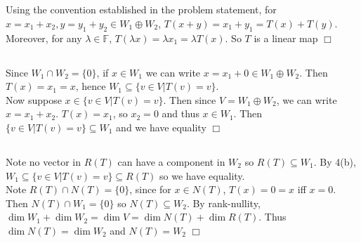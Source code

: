 \documentclass{article}
\begin{document}
\section{}
\subsection{}
Using the convention established in the problem statement, for $x = x_1 + x_2, y = y_1 + y_2 \in W_1 \oplus W_2$, $T(x+y) = x_1 + y_1 = T(x) + T(y)$. Moreover, for any $\lambda \in \mathbb{F}$, $T(\lambda x) = \lambda x_1 = \lambda T(x)$. So $T$ is a linear map $\Box$
\subsection{}
Since $W_1 \cap W_2 = \{0\}$, if $x \in W_1$ we can write $x = x_1 + 0 \in W_1 \oplus W_2$. Then $T(x) = x_1 = x$, hence $W_1 \subseteq \{v \in V | T(v) = v\}$.\\
Now suppose $x \in \{v \in V | T(v) = v\}$. Then since $V = W_1 \oplus W_2$, we can write $x = x_1 + x_2$. $T(x) = x_1$, so $x_2 = 0$ and thus $x \in W_1$. Then $\{v \in V | T(v) = v\} \subseteq W_1$ and we have equality $\Box$
\subsection{}
Note no vector in $R(T)$ can have a component in $W_2$ so $R(T) \subseteq W_1$. By 4(b), $W_1 \subseteq \{v \in V | T(v) = v\} \subseteq R(T)$ so we have equality.\\
Note $R(T) \cap N(T) = \{0\}$, since for $x \in N(T)$, $T(x) = 0 = x$ iff $x = 0$. Then $N(T) \cap W_1 = \{0\}$ so $N(T) \subseteq W_2$. By rank-nullity, $ \dim W_1 + \dim W_2 = \dim V = \dim N(T) + \dim R(T)$. Thus $\dim N(T) = \dim W_2$ and $N(T) = W_2$ $\Box$
\end{document}

